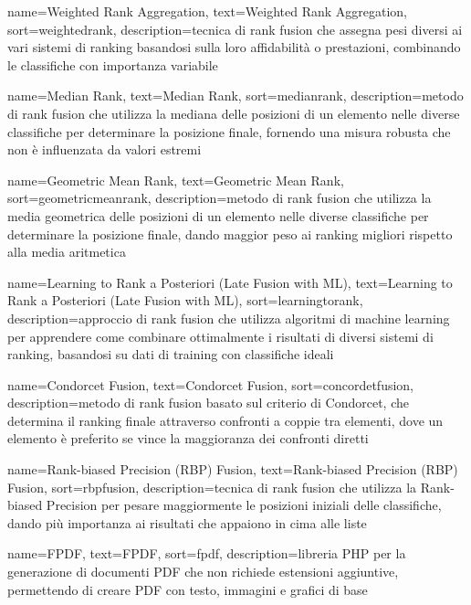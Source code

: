  {
    name=Weighted Rank Aggregation,
    text=Weighted Rank Aggregation,
    sort=weightedrank,
    description={tecnica di rank fusion che assegna pesi diversi ai vari sistemi di ranking basandosi sulla loro affidabilità o prestazioni, combinando le classifiche con importanza variabile}
}

 {
    name=Median Rank,
    text=Median Rank,
    sort=medianrank,
    description={metodo di rank fusion che utilizza la mediana delle posizioni di un elemento nelle diverse classifiche per determinare la posizione finale, fornendo una misura robusta che non è influenzata da valori estremi}
}

 {
    name=Geometric Mean Rank,
    text=Geometric Mean Rank,
    sort=geometricmeanrank,
    description={metodo di rank fusion che utilizza la media geometrica delle posizioni di un elemento nelle diverse classifiche per determinare la posizione finale, dando maggior peso ai ranking migliori rispetto alla media aritmetica}
}

 {
    name=Learning to Rank a Posteriori (Late Fusion with ML),
    text=Learning to Rank a Posteriori (Late Fusion with ML),
    sort=learningtorank,
    description={approccio di rank fusion che utilizza algoritmi di machine learning per apprendere come combinare ottimalmente i risultati di diversi sistemi di ranking, basandosi su dati di training con classifiche ideali}
}

 {
    name=Condorcet Fusion,
    text=Condorcet Fusion,
    sort=concordetfusion,
    description={metodo di rank fusion basato sul criterio di Condorcet, che determina il ranking finale attraverso confronti a coppie tra elementi, dove un elemento è preferito se vince la maggioranza dei confronti diretti}
}

 {
    name=Rank-biased Precision (RBP) Fusion,
    text=Rank-biased Precision (RBP) Fusion,
    sort=rbpfusion,
    description={tecnica di rank fusion che utilizza la Rank-biased Precision per pesare maggiormente le posizioni iniziali delle classifiche, dando più importanza ai risultati che appaiono in cima alle liste}
}

 {
    name=FPDF,
    text=FPDF,
    sort=fpdf,
    description={libreria PHP per la generazione di documenti PDF che non richiede estensioni aggiuntive, permettendo di creare PDF con testo, immagini e grafici di base}
}

